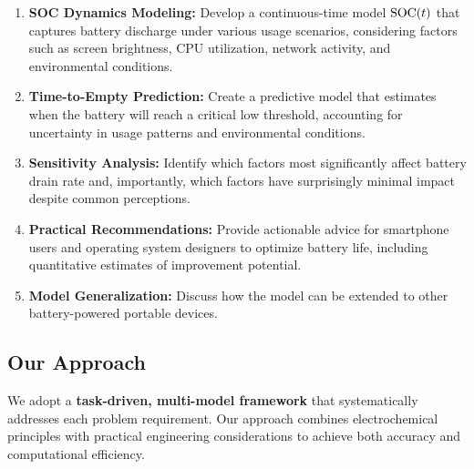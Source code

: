 \begin{enumerate}
    \item \textbf{SOC Dynamics Modeling:} Develop a continuous-time model $\text{SOC}(t)$ that captures battery discharge under various usage scenarios, considering factors such as screen brightness, CPU utilization, network activity, and environmental conditions.
    
    \item \textbf{Time-to-Empty Prediction:} Create a predictive model that estimates when the battery will reach a critical low threshold, accounting for uncertainty in usage patterns and environmental conditions.
    
    \item \textbf{Sensitivity Analysis:} Identify which factors most significantly affect battery drain rate and, importantly, which factors have surprisingly minimal impact despite common perceptions.
    
    \item \textbf{Practical Recommendations:} Provide actionable advice for smartphone users and operating system designers to optimize battery life, including quantitative estimates of improvement potential.
    
    \item \textbf{Model Generalization:} Discuss how the model can be extended to other battery-powered portable devices.
\end{enumerate}

\subsection{Our Approach}
\label{subsec:approach}

We adopt a \textbf{task-driven, multi-model framework} that systematically addresses each problem requirement. Our approach combines electrochemical principles \cite{Plett2015} with practical engineering considerations \cite{Waag2014} to achieve both accuracy and computational efficiency.

